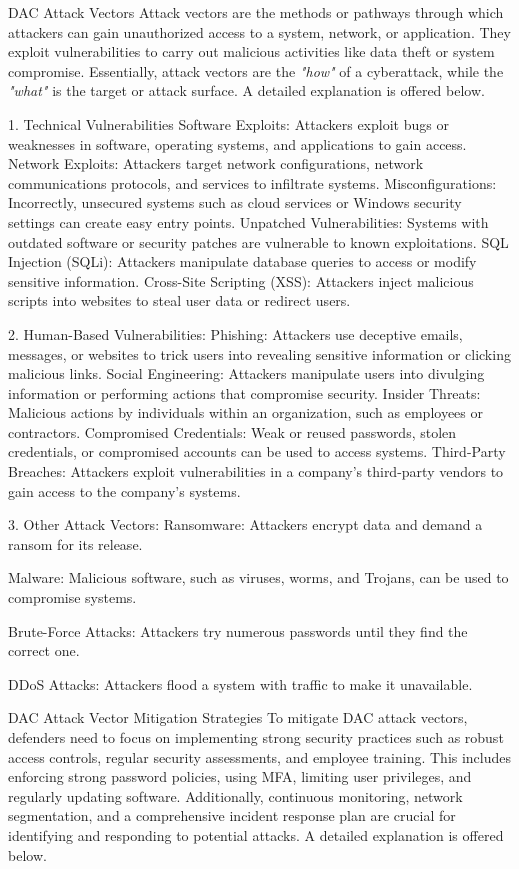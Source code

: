 DAC Attack Vectors
Attack vectors are the methods or pathways through which attackers can gain unauthorized access to a system, network, or application. They exploit vulnerabilities to carry out malicious activities like data theft or system compromise. Essentially, attack vectors are the \textit{"how"} of a cyberattack, while the \textit{"what"} is the target or attack surface. A detailed explanation is offered below.

1. Technical Vulnerabilities
Software Exploits:
Attackers exploit bugs or weaknesses in software, operating systems, and applications to gain access.
Network Exploits:
Attackers target network configurations, network communications protocols, and services to infiltrate systems.
Misconfigurations:
Incorrectly, unsecured systems such as cloud services or Windows security settings can create easy entry points.
Unpatched Vulnerabilities:
Systems with outdated software or security patches are vulnerable to known exploitations.
SQL Injection (SQLi): Attackers manipulate database queries to access or modify sensitive information.
Cross-Site Scripting (XSS): Attackers inject malicious scripts into websites to steal user data or redirect users.

2. Human-Based Vulnerabilities:
Phishing:
Attackers use deceptive emails, messages, or websites to trick users into revealing sensitive information or clicking malicious links. 
Social Engineering:
Attackers manipulate users into divulging information or performing actions that compromise security.
Insider Threats:
Malicious actions by individuals within an organization, such as employees or contractors. 
Compromised Credentials:
Weak or reused passwords, stolen credentials, or compromised accounts can be used to access systems. 
Third-Party Breaches:
Attackers exploit vulnerabilities in a company's third-party vendors to gain access to the company's systems. 

3. Other Attack Vectors:
Ransomware:
Attackers encrypt data and demand a ransom for its release. 

Malware:
Malicious software, such as viruses, worms, and Trojans, can be used to compromise systems. 

Brute-Force Attacks:
Attackers try numerous passwords until they find the correct one. 

DDoS Attacks:
Attackers flood a system with traffic to make it unavailable. 

DAC Attack Vector Mitigation Strategies
To mitigate DAC attack vectors, defenders need to focus on implementing strong security practices such as robust access controls, regular security assessments, and employee training. This includes enforcing strong password policies, using MFA, limiting user privileges, and regularly updating software. Additionally, continuous monitoring, network segmentation, and a comprehensive incident response plan are crucial for identifying and responding to potential attacks. A detailed explanation is offered below.

